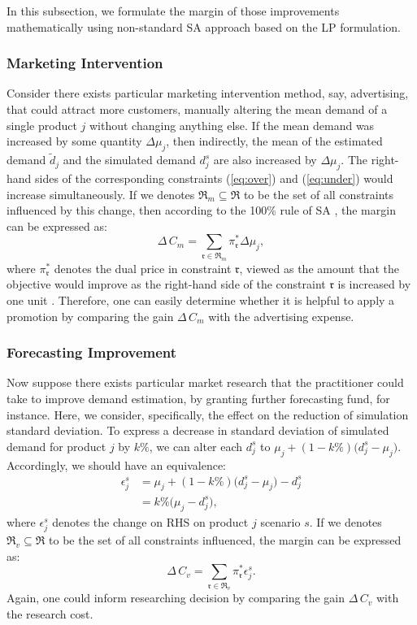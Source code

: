 \documentclass[a4paper,11pt]{article}
\begin{document}
In this subsection, we formulate the margin of those improvements mathematically using non-standard SA approach based on the LP formulation.

\subsubsection{Marketing Intervention}
Consider there exists particular marketing intervention method, say, advertising, that could attract more customers, manually altering the mean demand of a single product $j$ without changing anything else. If the mean demand was increased by some quantity $\Delta \mu_{j}$, then indirectly, the mean of the estimated demand $\tilde d_j$ and the simulated demand $d_j^s$ are also increased by $\Delta \mu_{j}$. The right-hand sides of the corresponding constraints (\ref{eq:over}) and (\ref{eq:under}) would increase simultaneously. If we denotes $\mathfrak{R}_m \subseteq \mathfrak{R}$ to be the set of all constraints influenced by this change, then according to the 100\% rule of SA \cite{DT06}, the margin can be expressed as:
\[
    \Delta \, C_{m} = \sum_{\mathfrak{r} \in \mathfrak{R}_m} \pi_\mathfrak{r}^* \Delta \mu_{j},
\]
where $\pi_\mathfrak{r}^*$ denotes the dual price in constraint $\mathfrak{r}$, viewed as the amount that the objective would improve as the right-hand side of the constraint $\mathfrak{r}$ is increased by one unit \cite{D98}. Therefore, one can easily determine whether it is helpful to apply a promotion by comparing the gain $\Delta \, C_{m}$ with the advertising expense.
 
\subsubsection{Forecasting Improvement}
Now suppose there exists particular market research that the practitioner could take to improve demand estimation, by granting further forecasting fund, for instance. Here, we consider, specifically, the effect on the reduction of simulation standard deviation. To express a decrease in standard deviation of simulated demand for product $j$ by $k\%$, we can alter each $d_j^s$ to $\mu_j + (1-k\%) \big( d_j^s - \mu_j \big)$. Accordingly, we should have an equivalence:
\[
\begin{aligned}
    \epsilon_j^s 
    & = \mu_j + (1-k\%) \big( d_j^s - \mu_j \big) - d_j^s\\
    & = k\% \big( \mu_j - d_j^s \big),
\end{aligned}
\]
where $\epsilon_j^s$ denotes the change on RHS on product $j$ scenario $s$.
If we denotes $\mathfrak{R}_v \subseteq \mathfrak{R}$ to be the set of all constraints influenced, 
the margin can be expressed as:
\[
    \Delta \, C_{v} = \sum_{\mathfrak{r} \in \mathfrak{R}_v} \pi_\mathfrak{r}^* \epsilon_{j}^s.
\]
Again, one could inform researching decision by comparing the gain $\Delta \, C_{v}$ with the research cost.
\end{document}
